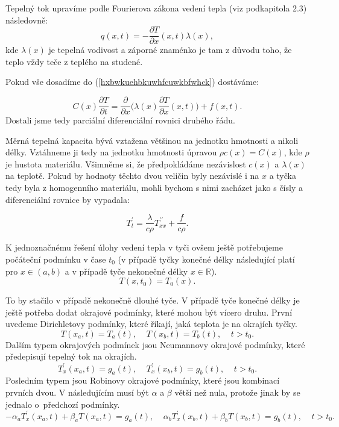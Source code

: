 \documentclass[a4]{report}
\theoremstyle{definition}
\begin{document}
Tepelný tok upravíme podle Fourierova zákona vedení tepla (viz podkapitola 2.3) následovně:
\begin{equation}
q(x,t)=-\frac{\partial T}{\partial x}(x,t)\lambda(x),
\end{equation}
kde $\lambda(x)$ je tepelná vodivost a záporné znaménko je tam z důvodu toho, že teplo vždy teče z teplého na studené.

Pokud vše dosadíme do (\ref{hxbwkuehbkuwhfcuwkbfwhck}) dostáváme:

\begin{equation}
C(x) \frac{\partial T}{\partial t}=\frac{\partial }{\partial x} \bigg(\lambda(x)\frac{\partial T}{\partial x}(x,t)\bigg)+f(x,t).
\end{equation}
Dostali jsme tedy parciální diferenciální rovnici druhého řádu.

Měrná tepelná kapacita bývá vztažena většinou na jednotku hmotnosti a nikoli délky. Vztáhneme ji tedy na jednotku hmotnosti úpravou $\rho c(x)=C(x)$, kde $\rho$ je hustota materiálu. Všimněme si, že předpokládáme nezávislost $c(x)$ a $\lambda(x)$ na teplotě. Pokud by hodnoty těchto dvou veličin byly nezávislé i na $x$ a tyčka tedy byla z homogenního materiálu, mohli bychom s nimi zacházet jako s čísly a diferenciální rovnice by vypadala: 

\begin{equation} T^\prime_t=\frac{\lambda}{ c\rho} T^{\prime\prime}_{xx}+\frac{f}{ c\rho}.
\end{equation}

K jednoznačnému řešení úlohy vedení tepla v tyči ovšem ještě potřebujeme počáteční podmínku v čase $t_0$ (v případě tyčky konečné délky následující platí pro $x\in (a,b)$ a v případě tyče nekonečné délky $x\in \mathbb{R}$).
\begin{equation} 
T(x,t_0)=T_0 (x).
\end{equation}

To by stačilo v případě nekonečně dlouhé tyče. V případě tyče konečné délky je ještě potřeba dodat okrajové podmínky, které mohou být vícero druhu. První uvedeme Dirichletovy podmínky, které říkají, jaká teplota je na okrajích tyčky.
\begin{equation}
T(x_a,t)=T_a(t), \ \ \ \ \ 
T(x_b,t)=T_b(t),  \ \ \ \ \   t>t_0.
\end{equation}
Dalším typem okrajových podmínek jsou Neumannovy okrajové podmínky, které předepisují tepelný tok na okrajích.
\begin{equation}
T^\prime_x(x_a,t)=g_a(t),  \ \ \ \ \
T^\prime_x(x_b,t)=g_b(t), \ \ \ \ \      t>t_0.
\end{equation}
Posledním typem jsou Robinovy okrajové podmínky, které jsou kombinací prvních dvou. V následujícím musí být $\alpha$ a $\beta$ větší než nula, protože jinak by se jednalo \mbox{o předchozí} podmínky.
\begin{equation}
-\alpha_a T^\prime_x(x_a,t)+\beta_a T(x_a,t)=g_a(t), \ \ \ \ \
\alpha_b T^\prime_x(x_b,t)+\beta_b T(x_b,t)=g_b(t),\ \ \ \ \   t>t_0.
\end{equation}
\end{document}
